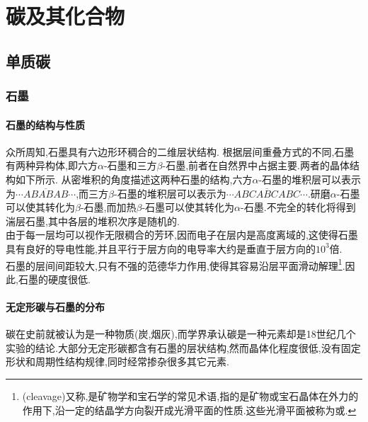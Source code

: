 \documentclass{ctexart}
\begin{document}
\section{碳及其化合物}
\subsection{单质碳}
\subsubsection{石墨}
\paragraph{石墨的结构与性质}
众所周知,石墨具有六边形环稠合的二维层状结构.
根据层间重叠方式的不同,石墨有两种异构体,即六方$\alpha$-石墨和三方$\beta$-石墨,前者在自然界中占据主要.两者的晶体结构如下所示.
从密堆积的角度描述这两种石墨的结构,六方$\alpha$-石墨的堆积层可以表示为$\cdots AB\overline{AB}AB\cdots$,而三方$\beta$-石墨的堆积层可以表示为$\cdots ABC\overline{ABC}ABC\cdots$.研磨$\alpha$-石墨可以使其转化为$\beta$-石墨,而加热$\beta$-石墨可以使其转化为$\alpha$-石墨.不完全的转化将得到湍层石墨,其中各层的堆积次序是随机的.\\
\indent 由于每一层均可以视作无限稠合的芳环,因而电子在层内是高度离域的,这使得石墨具有良好的导电性能,并且平行于层方向的电导率大约是垂直于层方向的$10^3$倍.\\
\indent 石墨的层间间距较大,只有不强的范德华力作用,使得其容易沿层平面滑动解理\footnote{(cleavage)又称,是矿物学和宝石学的常见术语,指的是矿物或宝石晶体在外力的作用下,沿一定的结晶学方向裂开成光滑平面的性质.这些光滑平面被称为或.}.因此,石墨的硬度很低.
\paragraph{无定形碳与石墨的分布}
碳在史前就被认为是一种物质(炭,烟灰),而学界承认碳是一种元素却是18世纪几个实验的结论.大部分无定形碳都含有石墨的层状结构,然而晶体化程度很低,没有固定形状和周期性结构规律,同时经常掺杂很多其它元素.
\end{document}
